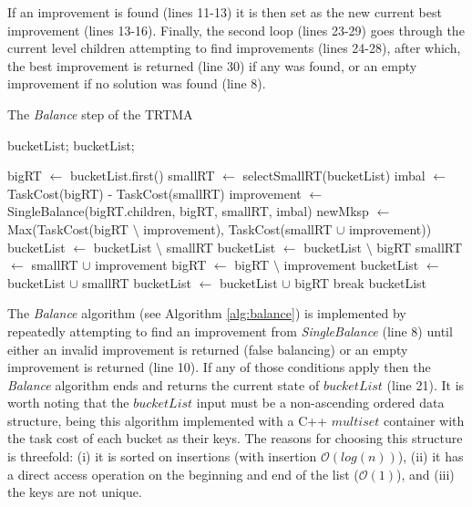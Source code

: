 If an improvement is found (lines 11-13) it is then set as the new current best improvement (lines 13-16). Finally, the second loop (lines 23-29) goes through the current level children attempting to find improvements (lines 24-28), after which, the best improvement is returned (line 30) if any was found, or an empty improvement if no solution was found (line 8). 

\begin{algorithm}[!h]
\footnotesize
		\caption{The {\em Balance} step of the TRTMA\label{alg:balance}}

		\begin{algorithmic}[1]
		 bucketList;
		 bucketList;

				\State bigRT $\gets$ bucketList.first()
				\State smallRT $\gets$ selectSmallRT(bucketList)
				\State imbal $\gets$ TaskCost(bigRT) - TaskCost(smallRT)
				\State improvement $\gets$ SingleBalance(bigRT.children, bigRT, smallRT, imbal)
				\State newMksp $\gets$ Max(TaskCost(bigRT $\setminus$ improvement), TaskCost(smallRT $\cup$ improvement))
						\State bucketList $\gets$ bucketList $\setminus$ smallRT
						\State bucketList $\gets$ bucketList $\setminus$ bigRT
						\State smallRT $\gets$ smallRT $\cup$ improvement
						\State bigRT $\gets$ bigRT $\setminus$ improvement
						\State bucketList $\gets$ bucketList $\cup$ smallRT
						\State bucketList $\gets$ bucketList $\cup$ bigRT
				\Else
						\State break
				\EndIf
		\EndWhile
		 bucketList

		\end{algorithmic}
\end{algorithm}

The {\em Balance} algorithm (see Algorithm \ref{alg:balance}) is implemented by repeatedly attempting to find an improvement from {\em SingleBalance} (line 8) until either an invalid improvement is returned (false balancing) or an empty improvement is returned (line 10). If any of those conditions apply then the {\em Balance} algorithm ends and returns the current state of $bucketList$ (line 21). It is worth noting that the $bucketList$ input must be a non-ascending ordered data structure, being this algorithm implemented with a C++ $multiset$ container with the task cost of each bucket as their keys. The reasons for choosing this structure is threefold: (i) it is sorted on insertions (with insertion $\mathcal{O}(log(n))$), (ii) it has a direct access operation on the beginning and end of the list ($\mathcal{O}(1)$), and (iii) the keys are not unique.

